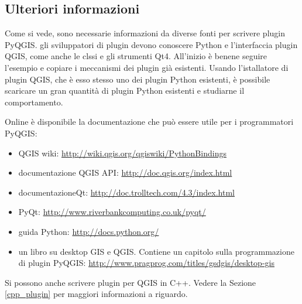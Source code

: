 \subsection{Ulteriori informazioni}

Come si vede, sono necessarie informazioni da diverse fonti per scrivere plugin PyQGIS. gli sviluppatori di plugin devono conoscere Python e l'interfaccia plugin QGIS, come anche le clssi e gli strumenti Qt4. All'inizio è benene seguire l'esempio e copiare i meccanismi dei plugin già esistenti. Usando l'istallatore di plugin QGIS, che è esso stesso uno dei plugin Python esistenti, è possibile scaricare un gran quantità di plugin Python esistenti e studiarne il comportamento.

Online è disponibile la documentazione che può essere utile per i programmatori PyQGIS:
 
\begin{itemize}
\item QGIS wiki: \url{http://wiki.qgis.org/qgiswiki/PythonBindings}
\item documentazione QGIS API: \url{http://doc.qgis.org/index.html}
\item documentazioneQt: \url{http://doc.trolltech.com/4.3/index.html}
\item PyQt: \url{http://www.riverbankcomputing.co.uk/pyqt/}
\item guida Python: \url{http://docs.python.org/}
\item un libro su desktop GIS e QGIS. Contiene un capitolo sulla programmazione di plugin PyQGIS: \url{http://www.pragprog.com/titles/gsdgis/desktop-gis} 
\end{itemize}

Si possono anche scrivere plugin per QGIS in C++. Vedere la Sezione \ref{cpp_plugin} per maggiori informazioni a riguardo.


